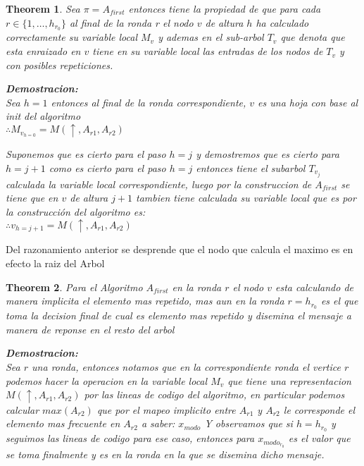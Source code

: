 \documentclass[11pt]{article}
\newtheorem{theorem}{Theorem}
\begin{document}
\begin{theorem}
Sea $ \pi = A_{first}$ entonces tiene la propiedad de que para cada $r \in \lbrace 1, \ldots, h_{r_{0}}  \rbrace $
al final de la ronda r el nodo $v$ de altura $h$ ha calculado correctamente su variable local $M_{v}$ y
ademas en el sub-arbol $T_{v}$ que denota que esta enraizado en $v$ tiene en su variable local las entradas de los nodos de $T_{v}$
y con posibles repeticiones.

    \textbf{Demostracion:} \\
Sea $h=1$ entonces al final de la ronda correspondiente, $v$ es una hoja con
base al init del algoritmo\\
$\therefore M_{v_{h=0}}= M(\uparrow, A_{r1}, A_{r2})$

Suponemos que es cierto para el paso $h=j$  y demostremos que es cierto para $h = j+1$
como es cierto para el paso $h =j$ entonces tiene el subarbol $T_{v_{j}}$ calculada la variable
local correspondiente, luego por la construccion de $A_{first}$ se tiene que en $v$ de altura $j+1$
tambien tiene calculada su variable local que es por la construcción del algoritmo es:
\\
$\therefore {v_{h = j+1}} = M(\uparrow, A_{r1}, A_{r2})$
\end{theorem}
Del razonamiento anterior se desprende que el nodo que calcula el maximo es en efecto la raiz del Arbol

\begin{theorem}
    Para el Algoritmo $A_{first}$ en la ronda $r$ el nodo $v$ esta calculando de manera implicita el elemento mas repetido,
    mas aun en la ronda $r = h_{r_{0}}$ es el que toma la decision final de cual es elemento mas repetido y disemina
    el mensaje a manera de reponse en el resto del arbol

    \textbf{Demostracion:}\\
    Sea $r$ una ronda, entonces notamos que en la correspondiente ronda el vertice $r$ podemos hacer la operacion
    en la variable local $M_{v}$ que tiene una representacion $M(\uparrow, A_{r1}, A_{r2})$ por las lineas de codigo del
    algoritmo, en particular  podemos calcular $max(A_{r2})$ que por el mapeo implicito entre $A_{r1}$ y $A_{r2}$ le corresponde
    el elemento mas frecuente en $A_{r2}$ a saber: $x_{modo}$
    Y observamos que si $h= h_{r_{0}}$ y seguimos las lineas de codigo para ese caso, entonces para $x_{modo_{r_0}}$ es el valor
    que se toma finalmente y es en la ronda en la que se  disemina dicho mensaje.

\end{theorem}
\end{document}

